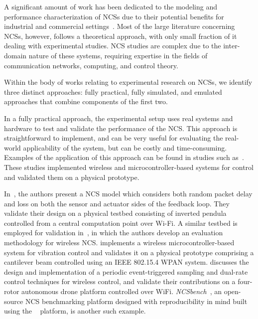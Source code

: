 A significant amount of work has been dedicated to the modeling and performance characterization of \glspl{NCS} due to their potential benefits for industrial and commercial settings~\cite{lu2016real,hespanha2007survey,zhang2013network,zhang2016survey}.
Most of the large literature concerning \glspl{NCS}, however, follows a theoretical approach, with only small fraction of it dealing with experimental studies.
\gls{NCS} studies are complex due to the inter-domain nature of these systems, requiring expertise in the fields of communication networks, computing, and control theory.

Within the body of works relating to experimental research on \glspl{NCS}, we identify three distinct approaches: fully practical, fully simulated, and emulated approaches that combine components of the first two.

In a fully practical approach, the experimental setup uses real systems and hardware to test and validate the performance of the \gls{NCS}.
This approach is straightforward to implement, and can be very useful for evaluating the real-world applicability of the system, but can be costly and time-consuming.
Examples of the application of this approach can be found in studies such as~\cite{drew2005networked,baumann2018evaluating,li2014wireless,cuenca2019periodic}.
These studies implemented wireless and microcontroller-based systems for control and validated them on a physical prototype.

In~\cite{drew2005networked}, the authors present a \gls{NCS} model which considers both random packet delay and loss on both the sensor and actuator sides of the feedback loop.
They validate their design on a physical testbed consisting of inverted pendula controlled from a central computation point over Wi-Fi.
A similar testbed is employed for validation in~\cite{baumann2018evaluating}, in which the authors develop an evaluation methodology for wireless \gls{NCS}.\@
\cite{li2014wireless} implements a wireless microcontroller-based system for vibration control and validates it on a physical prototype comprising a cantilever beam controlled using an \acs{IEEE} 802.15.4 \gls{WPAN} system.\@ \cite{cuenca2019periodic} discusses the design and implementation of a periodic event-triggered sampling and dual-rate control techniques for wireless control, and validate their contributions on a four-rotor autonomous drone platform controlled over WiFi.
\emph{NCSbench}~\cite{zoppi2020ncsbench}, an open-source \gls{NCS} benchmarking platform designed with reproducibility in mind built using the ~\cite{LEGOMindstormsEV3} platform, is another such example.

